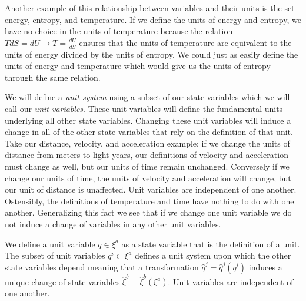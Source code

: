 \documentclass{article}
\begin{document}
	
	Another example of this relationship between variables and their units is the set energy, entropy, and temperature. If we define the units of energy and entropy, we have no choice in the units of temperature because the relation $T dS = dU \to T = \frac{dU}{dS}$ ensures that the units of temperature are equivalent to the units of energy divided by the units of entropy. We could just as easily define the units of energy and temperature which would give us the units of entropy through the same relation.
	
	 We will define a \textit{unit system} using a subset of our state variables which we will call our \textit{unit variables}. These unit variables will define the fundamental units underlying all other state variables. Changing these unit variables will induce a change in all of the other state variables that rely on the definition of that unit. Take our distance, velocity, and acceleration example; if we change the units of distance from meters to light years, our definitions of velocity and acceleration must change as well, but our units of time remain unchanged. Conversely if we change our units of time, the units of velocity and acceleration will change, but our unit of distance is unaffected. Unit variables are independent of one another. Ostensibly, the definitions of temperature and time have nothing to do with one another.  Generalizing this fact we see that if we change one unit variable we do not induce a change of variables in any other unit variables.

\begin{defn}
	We define a unit variable $q \in \xi^a$ as a state variable that is the definition of a unit. The subset of unit variables $q^i \subset \xi^a$ defines a unit system upon which the other state variables depend meaning that a transformation $\hat{q}^j = \hat{q}^j(q^i)$ induces a unique change of state variables $\hat{\xi}^b = \hat{\xi}^b(\xi^a)$. Unit variables are independent of one another.
\end{defn}

	
\end{document}
